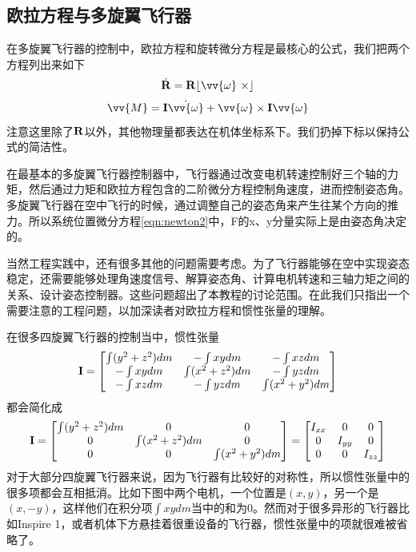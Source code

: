 \documentclass[11pt]{article}
\begin{document}
\subsection{欧拉方程与多旋翼飞行器}
在多旋翼飞行器的控制中，欧拉方程和旋转微分方程是最核心的公式，我们把两个方程列出来如下
$$
\dot{{\bf R}} = {\bf R}\lfloor \vv{\omega} \ \times \rfloor
$$
$$
\vv{M} = {\bf I}\dot{\vv{\omega}} + \vv{\omega} \times {\bf I}\vv{\omega}
$$
注意这里除了${\bf R}$以外，其他物理量都表达在机体坐标系下。我们扔掉下标以保持公式的简洁性。

在最基本的多旋翼飞行器控制器中，飞行器通过改变电机转速控制好三个轴的力矩，然后通过力矩和欧拉方程包含的二阶微分方程控制角速度，进而控制姿态角。多旋翼飞行器在空中飞行的时候，通过调整自己的姿态角来产生往某个方向的推力。所以系统位置微分方程\ref{eqn:newton2}中，F的x、y分量实际上是由姿态角决定的。

当然工程实践中，还有很多其他的问题需要考虑。为了飞行器能够在空中实现姿态稳定，还需要能够处理角速度信号、解算姿态角、计算电机转速和三轴力矩之间的关系、设计姿态控制器。这些问题超出了本教程的讨论范围。在此我们只指出一个需要注意的工程问题，以加深读者对欧拉方程和惯性张量的理解。

在很多四旋翼飞行器的控制当中，惯性张量
$$
{\bf I} = 
\begin{bmatrix}
\int (y^2+z^2) dm	&	-\int xy dm		&	-\int xz dm	\\
-\int xy dm		&	\int (x^2+z^2) dm	&	-\int yz dm	\\
-\int xz dm		&	-\int yz dm		&	\int (x^2+y^2) dm
\end{bmatrix}
$$
都会简化成
\begin{equation}\label{eqn:simpleintertia}
{\bf I} = 
\begin{bmatrix}
\int (y^2+z^2) dm	&	0		&	0	\\
0		&	\int (x^2+z^2) dm	&	0	\\
0		&	0		&	\int (x^2+y^2) dm
\end{bmatrix} = 
\begin{bmatrix}
I_{xx}	&	0		&	0	\\
0		&	I_{yy}	&	0	\\
0		&	0		&	I_{zz}
\end{bmatrix}
\end{equation}
对于大部分四旋翼飞行器来说，因为飞行器有比较好的对称性，所以惯性张量中的很多项都会互相抵消。比如下图中两个电机，一个位置是$(x,y)$，另一个是$(x,-y)$，这样他们在积分项$\int xy dm$当中的和为0。然而对于很多异形的飞行器比如Inspire 1，或者机体下方悬挂着很重设备的飞行器，惯性张量中的项就很难被省略了。
\end{document}
